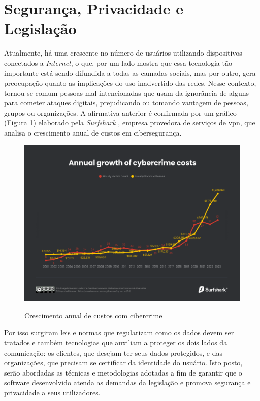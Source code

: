 \section{Segurança, Privacidade e Legislação}
Atualmente, há uma crescente no número de usuários utilizando dispositivos conectados a \textit{Internet}, o que, por um lado mostra que essa tecnologia tão importante está sendo difundida a todas as camadas sociais, mas por outro, gera preocupação quanto as implicações do uso inadvertido das redes.
Nesse contexto, tornou-se comum pessoas mal intencionadas que usam da ignorância de alguns para cometer ataques digitais, prejudicando ou tomando vantagem de pessoas, grupos ou organizações. A afirmativa anterior é confirmada por um gráfico (Figura \ref{fig:cibercrimes}) elaborado pela \emph{Surfshark} \cite{Surfshark}, empresa provedora de serviços de \gls{vpn}, que analisa o crescimento anual de custos em cibersegurança. 
\begin{figure}[h]
	\centering
	\caption{Crescimento anual de custos com cibercrime}
	\includegraphics[width=1\textwidth]{cap04-desenvolvimento/images/4-6-annual-growth-of-cybercrime-costs.png}
	\label{fig:cibercrimes}
\end{figure}

Por isso surgiram leis e normas que regularizam como os dados devem ser tratados e também tecnologias que auxiliam a proteger os dois lados da comunicação: os clientes, que desejam ter seus dados protegidos, e das organizações, que precisam se certificar da identidade do usuário.
Isto posto, serão abordadas as técnicas e metodologias adotadas a fim de garantir que o software desenvolvido atenda as demandas da legislação e promova segurança e privacidade a seus utilizadores.

